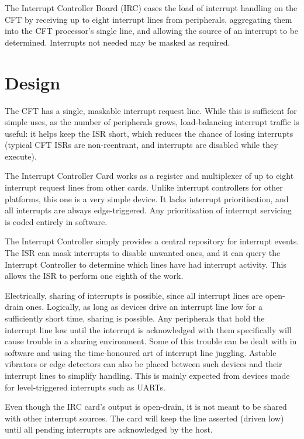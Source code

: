 
The Interrupt Controller Board (IRC) eases the load of interrupt handling on
the CFT by receiving up to eight interrupt lines from peripherals, aggregating
them into the CFT processor's single  line, and allowing the source of
an interrupt to be determined. Interrupts not needed may be masked as required.

\section{Design}

The CFT has a single, maskable interrupt request line. While this is sufficient
for simple uses, as the number of peripherals grows, load-balancing interrupt
traffic is useful: it helps keep the \gls{ISR} short, which reduces the chance
of losing interrupts (typical CFT ISRs are non-reentrant, and interrupts are
disabled while they execute).

The Interrupt Controller Card works as a register and multiplexer of up to
eight interrupt request lines from other cards. Unlike interrupt controllers
for other platforms, this one is a very simple device. It lacks interrupt
prioritisation, and all interrupts are always edge-triggered. Any
prioritisation of interrupt servicing is coded entirely in software.

The Interrupt Controller simply provides a central repository for interrupt
events. The ISR can mask interrupts to disable unwanted ones, and it can query
the Interrupt Controller to determine which lines have had interrupt
activity. This allows the ISR to perform one eighth of the work.

Electrically, sharing of interrupts is possible, since all interrupt lines are
open-drain ones. Logically, as long as devices drive an interrupt line low for
a sufficiently short time, sharing is possible. Any peripherals that hold the
interrupt line low until the interrupt is acknowledged with them specifically
will cause trouble in a sharing environment. Some of this trouble can be dealt
with in software and using the time-honoured art of interrupt line
juggling. Astable vibrators or edge detectors can also be placed between such
devices and their interrupt lines to simplify handling. This is mainly expected
from devices made for level-triggered interrupts such as \glspl{UART}.

Even though the IRC card's output is open-drain, it is not meant to be shared
with other interrupt sources. The card will keep the  line asserted
(driven low) until all pending interrupts are acknowledged by the host.

